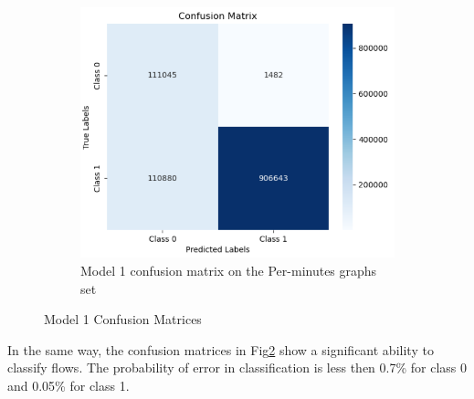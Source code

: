 \begin{figure}[H]
    \begin{subfigure}{0.49\textwidth}
        \centering
        \includegraphics[width=\linewidth]{figures/ev/1_cm3.png}
        \caption{Model 1 confusion matrix on the Per-minutes graphs set}
    \label{fig:1_cm3}
    \end{subfigure}
    \captionsetup{font=large}
    \caption{Model 1 Confusion Matrices}
    \label{fig:1_cm}
\end{figure}
In the same way, the confusion matrices in Fig\ref{fig:1_cm} show a significant ability to classify flows. The probability of error in classification is less then 0.7\%  for class 0 and 0.05\% for class 1. 
